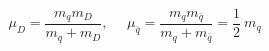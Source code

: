 \begin{equation}
\mu_D= \frac{m_q m_D}{m_q + m_D},~~~~~~\mu_{\bar{q}}=\frac{m_q m_{\bar{q}}}{m_q+m_{\bar{q}}} =\frac{1}{2}~m_q
\end{equation}

